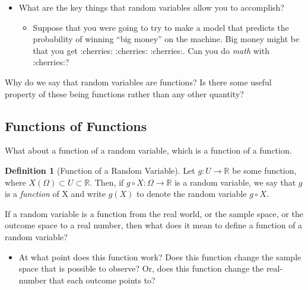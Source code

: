 \documentclass[
]{book}
\providecommand{\tightlist}{%
  \setlength{\itemsep}{0pt}\setlength{\parskip}{0pt}}
\theoremstyle{definition}
\newtheorem{definition}{Definition}[chapter]
\theoremstyle{definition}
\theoremstyle{definition}
\theoremstyle{definition}
\theoremstyle{remark}
\begin{document}
\begin{itemize}
\tightlist
\item
  What are the key things that random variables allow you to accomplish?

  \begin{itemize}
  \tightlist
  \item
    Suppose that you were going to try to make a model that predicts the probability of winning ``big money'' on the machine. Big money might be that you get :cherries: :cherries: :cherries:. Can you do \emph{math} with :cherries:?
  \end{itemize}
\end{itemize}

Why do we say that random variables are functions? Is there some useful property of these being functions rather than any other quantity?

\hypertarget{functions-of-functions}{%
\subsection{Functions of Functions}\label{functions-of-functions}}

What about a function of a random variable, which is a function of a function.

\begin{definition}[Function of a Random Variable]
Let \(g : U \rightarrow \mathbb{R}\) be some function, where \(X(\Omega) \subset U \subset \mathbb{R}\). Then, if \(g \circ X : \Omega \rightarrow \mathbb{R}\) is a random variable, we say that \(g\) is a \emph{function} of X and write \(g(X)\) to denote the random variable \(g \circ X\).
\end{definition}

If a random variable is a function from the real world, or the sample space, or the outcome space to a real number, then what does it mean to define a function of a random variable?

\begin{itemize}
\tightlist
\item
  At what point does this function work? Does this function change the sample space that is possible to observe? Or, does this function change the real-number that each outcome points to?
\end{itemize}
\end{document}
